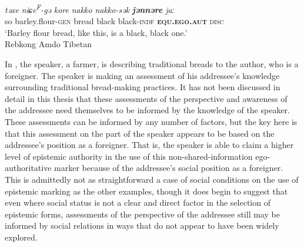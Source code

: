\begin{exe}
    \ex \label{e:Discussion:AmdoAuth}
    \gll \textit{təxe} \textit{niɕe\textsuperscript{F}-gə} \textit{kore} \textit{nakko} \textit{nakko-sək} \textbf{\textit{jənnəre}} \textit{jaː} \\
    so barley.flour-\textsc{gen} bread black black-\textsc{indf} \textbf{\textsc{equ.ego.aut}} \textsc{disc} \\
    \glt `Barley flour bread, like this, is a black, black one.' \\
    Rebkong Amdo Tibetan \cite[Tibetic:PRC,][300]{Simon2021}
\end{exe}

In , the speaker, a farmer, is describing traditional breads to the author, who is a foreigner. The speaker is making an assessment of his addressee's knowledge surrounding traditional bread-making practices. It has not been discussed in detail in this thesis that these assessments of the perspective and awareness of the addressee need themselves to be informed by the knowledge of the speaker. These assessments can be informed by any number of factors, but the key here is that this assessment on the part of the speaker appears to be based on the addressee's position as a foreigner. That is, the speaker is able to claim a higher level of epistemic authority in the use of this non-shared-information ego-authoritative marker because of the addressee's social position as a foreigner. This is admittedly not as straightforward a case of social conditions on the use of epistemic marking as the other examples, though it does begin to suggest that even where social status is not a clear and direct factor in the selection of epistemic forms, assessments of the perspective of the addressee still may be informed by social relations in ways that do not appear to have been widely explored.

